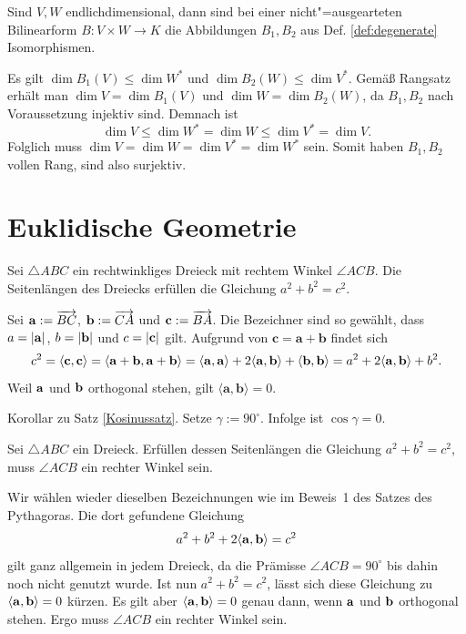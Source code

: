 \begin{Satz}
Sind $V,W$ endlichdimensional, dann sind bei einer nicht"=ausgearteten
Bilinearform $B\colon V\times W\to K$ die Abbildungen $B_1,B_2$ aus
Def. \ref{def:degenerate} Isomorphismen.
\end{Satz}
\begin{Beweis}
Es gilt $\dim B_1(V)\le\dim W^*$ und $\dim B_2(W)\le\dim V^*$. Gemäß
Rangsatz erhält man $\dim V=\dim B_1(V)$ und $\dim W=\dim B_2(W)$,
da $B_1,B_2$ nach Voraussetzung injektiv sind. Demnach ist
\begin{equation}
\dim V \le \dim W^* = \dim W \le \dim V^* = \dim V.
\end{equation}
Folglich muss $\dim V=\dim W=\dim V^*=\dim W^*$ sein. Somit haben
$B_1,B_2$ vollen Rang, sind also surjektiv.\;\qedsymbol
\end{Beweis}

\newpage
\section{Euklidische Geometrie}
\begin{Satz}\newlinefirst
Sei $\triangle ABC$ ein rechtwinkliges Dreieck mit rechtem
Winkel $\angle ACB$. Die Seitenlängen des Dreiecks erfüllen die
Gleichung $a^2+b^2 = c^2$.
\end{Satz}
\begin{Beweis}[Beweis 1]
Sei $\mathbf{a} := \overrightarrow{BC}$, $\mathbf{b} := \overrightarrow{CA}$ und
$\mathbf{c} := \overrightarrow{BA}$. Die Bezeichner sind so gewählt, dass
$a=|\mathbf{a}|$, $b=|\mathbf{b}|$ und $c=|\mathbf{c}|$ gilt.
Aufgrund von $\mathbf c = \mathbf a + \mathbf b$ findet sich
\[c^2 = \langle\mathbf{c},\mathbf{c}\rangle = \langle\mathbf{a}+\mathbf{b},
\mathbf{a}+\mathbf{b}\rangle = \langle\mathbf{a},\mathbf{a}\rangle
+ 2\langle\mathbf{a},\mathbf{b}\rangle+\langle\mathbf{b},\mathbf{b}\rangle
= a^2 + 2\langle\mathbf{a},\mathbf{b}\rangle + b^2.\]
Weil $\mathbf{a}$ und $\mathbf{b}$ orthogonal stehen, gilt
$\langle\mathbf a,\mathbf b\rangle = 0$.\,\qedsymbol
\end{Beweis}
\begin{Beweis}[Beweis 2]
Korollar zu Satz \ref{Kosinussatz}.
Setze $\gamma:=90^\circ$. Infolge ist $\cos\gamma=0$.\,\qedsymbol
\end{Beweis}

\begin{Satz}\newlinefirst
Sei $\triangle ABC$ ein Dreieck. Erfüllen dessen Seitenlängen
die Gleichung $a^2+b^2=c^2$, muss $\angle ACB$ ein
rechter Winkel sein.
\end{Satz}
\begin{Beweis}
Wir wählen wieder dieselben Bezeichnungen wie im Beweis~1 des Satzes
des Pythagoras. Die dort gefundene Gleichung
\[a^2 + b^2 + 2\langle\mathbf{a},\mathbf{b}\rangle = c^2\]
gilt ganz allgemein in jedem Dreieck, da die Prämisse
$\angle ACB=90^\circ$ bis dahin noch
nicht genutzt wurde. Ist nun $a^2+b^2=c^2$, lässt sich diese
Gleichung zu $\langle\mathbf{a},\mathbf{b}\rangle = 0$ kürzen.
Es gilt aber $\langle\mathbf{a},\mathbf{b}\rangle = 0$ genau dann,
wenn $\mathbf{a}$ und $\mathbf{b}$ orthogonal stehen. Ergo muss
$\angle ACB$ ein rechter Winkel sein.\,\qedsymbol
\end{Beweis}

